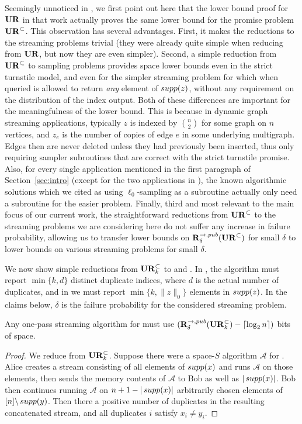 Seemingly unnoticed in \cite{JowhariST11}, we first point out here that the lower bound proof for $\mathbf{UR}$ in that work actually proves the same lower bound for the promise problem $\mathbf{UR}^\subset$. This observation has several advantages. First, it makes the reductions to the streaming problems trivial (they were already quite simple when reducing from $\mathbf{UR}$, but now they are even simpler). Second, a simple reduction from $\mathbf{UR}^\subset$ to sampling problems provides space lower bounds even in the strict turnstile model, and even for the simpler {\em \suppfind{}} streaming problem for which when queried is allowed to return {\em any} element of $\mathop{supp}(z)$, without any requirement on the distribution of the index output. Both of these differences are important for the meaningfulness of the lower bound. This is because in dynamic graph streaming applications, typically $z$ is indexed by $\binom{n}{2}$ for some graph on $n$ vertices, and $z_e$ is the number of copies of edge $e$ in some underlying multigraph. Edges then are never deleted unless they had previously been inserted, thus only requiring sampler subroutines that are correct with the strict turnstile promise. Also, for every single application mentioned in the first paragraph of Section~\ref{sec:intro} (except for the two applications in \cite{FrahlingIS08}), the known algorithmic solutions which we cited as using $\ell_0$-sampling as a subroutine actually only need a subroutine for the easier \suppfind{} problem. Finally, third and most relevant to the main focus of our current work, the straightforward reductions from $\mathbf{UR}^\subset$ to the streaming problems we are considering here do not suffer any increase in failure probability, allowing us to transfer lower bounds on $\mathbf{R}^{\rightarrow,pub}_{\delta}(\mathbf{UR}^\subset)$ for small $\delta$ to lower bounds on various streaming problems for small $\delta$.

We now show simple reductions from $\mathbf{UR}_k^\subset$ to  and . In , the algorithm must report $\min\{k, d\}$ distinct duplicate indices, where $d$ is the actual number of duplicates, and in  we must report $\min\{k,\|z\|_0\}$ elements in $\mathop{supp}(z)$. In the claims below, $\delta$ is the failure probability for the considered streaming problem.

\begin{claim}
Any one-pass streaming algorithm for  must use $(\mathbf{R}^{\rightarrow,pub}_{\delta}(\mathbf{UR}_k^\subset) - \lceil \log_2 n\rceil)$ bits of space.
\end{claim}
\begin{proof}
  We reduce from $\mathbf{UR}_k^\subset$. Suppose there were a space-$S$ algorithm $\mathcal{A}$ for . Alice creates a stream consisting of all elements of $\mathop{supp}(x)$ and runs $\mathcal{A}$ on those elements, then sends the memory contents of $\mathcal{A}$ to Bob as well as $|\mathop{supp}(x)|$. Bob then continues running $\mathcal{A}$ on $n+1-|\mathop{supp}(x)|$ arbitrarily chosen elements of $[n]\backslash\mathop{supp}(y)$. Then there a positive number of duplicates in the resulting concatenated stream, and all duplicates $i$ satisfy $x_i\neq y_i$.
\end{proof}

